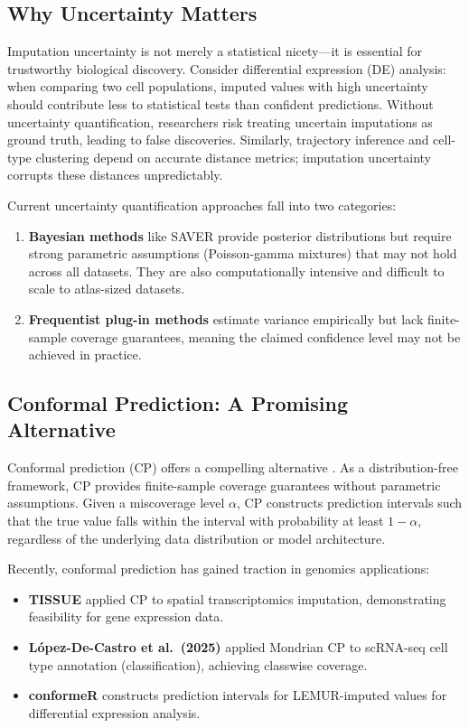 \documentclass{article}
\begin{document}
\subsection{Why Uncertainty Matters}

Imputation uncertainty is not merely a statistical nicety---it is essential for trustworthy biological discovery. Consider differential expression (DE) analysis: when comparing two cell populations, imputed values with high uncertainty should contribute less to statistical tests than confident predictions. Without uncertainty quantification, researchers risk treating uncertain imputations as ground truth, leading to false discoveries. Similarly, trajectory inference and cell-type clustering depend on accurate distance metrics; imputation uncertainty corrupts these distances unpredictably.

Current uncertainty quantification approaches fall into two categories:

\begin{enumerate}
    \item \textbf{Bayesian methods} like SAVER \citep{huang2018saver} provide posterior distributions but require strong parametric assumptions (Poisson-gamma mixtures) that may not hold across all datasets. They are also computationally intensive and difficult to scale to atlas-sized datasets.
    \item \textbf{Frequentist plug-in methods} estimate variance empirically but lack finite-sample coverage guarantees, meaning the claimed confidence level may not be achieved in practice.
\end{enumerate}

\subsection{Conformal Prediction: A Promising Alternative}

Conformal prediction (CP) offers a compelling alternative \citep{shafer2008tutorial, angelopoulos2021gentle}. As a distribution-free framework, CP provides finite-sample coverage guarantees without parametric assumptions. Given a miscoverage level $\alpha$, CP constructs prediction intervals such that the true value falls within the interval with probability at least $1-\alpha$, regardless of the underlying data distribution or model architecture.

Recently, conformal prediction has gained traction in genomics applications:

\begin{itemize}
    \item \textbf{TISSUE} \citep{sun2024tissue} applied CP to spatial transcriptomics imputation, demonstrating feasibility for gene expression data.
    \item \textbf{L{\'o}pez-De-Castro et al.~(2025)} \citep{lopez2025conformal} applied Mondrian CP to scRNA-seq cell type annotation (classification), achieving classwise coverage.
    \item \textbf{conformeR} \citep{leclerc2025conformer} constructs prediction intervals for LEMUR-imputed values for differential expression analysis.
\end{itemize}
\end{document}
